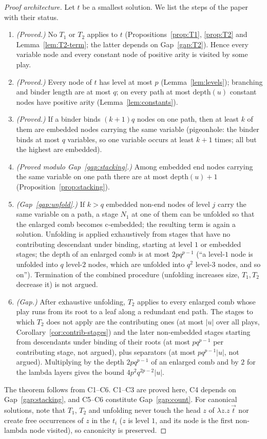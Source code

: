 \documentclass[11pt]{article}
\newcommand{\depth}{\mathrm{depth}}
\theoremstyle{plain}
\theoremstyle{definition}
\theoremstyle{remark}
\begin{document}
\begin{proof}[Proof architecture]
Let $t$ be a smallest solution.  We list the steps of the paper with
their status.
\begin{enumerate}[{C}1.]
\item \emph{(Proved.)} No $T_1$ or $T_2$ applies to $t$
  (Propositions~\ref{prop:T1}, \ref{prop:T2} and
  Lemma~\ref{lem:T2-term}; the latter depends on Gap~\ref{gap:T2}).
  Hence every variable node and every constant node of positive arity
  is visited by some play.
\item \emph{(Proved.)} Every node of $t$ has level at most $p$
  (Lemma~\ref{lem:levels}); branching and binder length are at most
  $q$; on every path at most $\depth(u)$ constant nodes have positive
  arity (Lemma~\ref{lem:constants}).
\item \emph{(Proved.)} If a binder binds $(k+1)q$ nodes on one path, then
  at least $k$ of them are embedded nodes carrying the same variable
  (pigeonhole: the binder binds at most $q$ variables, so one variable
  occurs at least $k+1$ times; all but the highest are embedded).
\item \emph{(Proved modulo Gap~\ref{gap:stacking}.)} Among embedded end
  nodes carrying the same variable on one path there are at most
  $\depth(u)+1$ (Proposition~\ref{prop:stacking}).
\item \emph{(Gap~\ref{gap:unfold}.)} If $k>q$ embedded non-end nodes of
  level $j$ carry the same variable on a path, a stage $N_1$ at one of
  them can be unfolded so that the enlarged comb becomes c-embedded; the
  resulting term is again a solution.  Unfolding is applied exhaustively
  from stages that have no contributing descendant under binding,
  starting at level $1$ or embedded stages; the depth of an enlarged
  comb is at most $2pq^{p-1}$ (``a level-$1$ node is unfolded into $q$
  level-$2$ nodes, which are unfolded into $q^2$ level-$3$ nodes, and so
  on'').  Termination of the combined procedure (unfolding increases
  size, $T_1,T_2$ decrease it) is not argued.
\item \emph{(Gap.)} After exhaustive unfolding, $T_2$ applies to every
  enlarged comb whose play runs from its root to a leaf along a
  redundant end path.  The stages to which $T_2$ does not apply are the
  contributing ones (at most $|u|$ over all plays,
  Corollary~\ref{cor:contrib-stages}) and the later non-embedded stages
  starting from descendants under binding of their roots (at most
  $pq^{p-1}$ per contributing stage, not argued), plus separators (at
  most $pq^{p-1}|u|$, not argued).  Multiplying by the depth
  $2pq^{p-1}$ of an enlarged comb and by $2$ for the lambda layers gives
  the bound $4p^2q^{2p-2}|u|$.
\end{enumerate}
The theorem follows from C1--C6.  C1--C3 are proved here, C4 depends on
Gap~\ref{gap:stacking}, and C5--C6 constitute Gap~\ref{gap:count}.
For canonical solutions, note that $T_1$, $T_2$ and unfolding never
touch the head $z$ of $\lambda z.z\,\vec t$ nor create free occurrences
of $z$ in the $t_i$ ($z$ is level $1$, and its node is the first
non-lambda node visited), so canonicity is preserved.
\end{proof}
\end{document}
